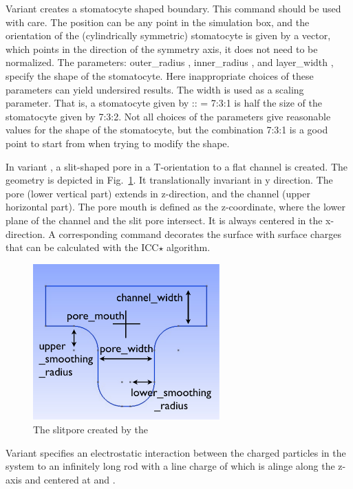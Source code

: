 Variant  creates a stomatocyte shaped boundary. This command
should be used with care. The position can be any point in the simulation
box, and the orientation of the (cylindrically symmetric) stomatocyte is
given by a vector, which points in the direction of the symmetry axis, it
does not need to be normalized. The parameters: outer_radius ,
inner_radius , and layer_width , specify the shape of the
stomatocyte. Here inappropriate choices of these parameters can yield 
undersired results. The width is used as a scaling parameter. That is,
a stomatocyte given by :: = 7:3:1 is half the size
of the stomatocyte given by 7:3:2. Not all choices of the parameters give
reasonable values for the shape of the stomatocyte, but the combination
7:3:1 is a good point to start from when trying to modify the shape. 

In variant , a slit-shaped pore in a T-orientation to a flat channel
is created. 
The geometry is depicted in Fig.~\ref{fig:slitpore}.
It translationally invariant in y direction.
The pore (lower vertical part) extends in z-direction, and the channel (upper
horizontal part). The pore mouth is defined as the z-coordinate, where the lower
plane of the channel and the slit pore intersect. It is always centered in the
x-direction. A corresponding  command decorates the surface
with surface charges that can be calculated with the ICC$\star$ algorithm.
\begin{figure}[ht]
  \label{fig:slitpore}
  \begin{center}
  \includegraphics[height=6cm]{figures/slitpore.pdf}
  \caption{The slitpore created by the }
  \end{center}
\end{figure}

Variant  specifies an electrostatic interaction between the
charged particles in the system to an infinitely long rod with a line
charge of  which is alinge along the z-axis and centered
at  and .

